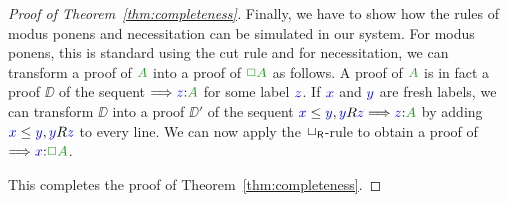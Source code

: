 \begin{proof}[Proof of Theorem~\ref{thm:completeness}]
  
  
  Finally, we have to show how the rules of modus ponens and
  necessitation can be simulated in our system. For modus ponens, this
  is standard using the cut rule and for necessitation, we can
  transform a proof of $\fm A$ into a proof of $\fm{\BOX A}$ as
  follows.
  A proof of $\fm A$ is in fact a proof $\DD$ of the sequent
  $\SEQ{\labels{z}{A}}$ for some label ${\color{blue}{z}}$. If ${\color{blue}{x}}$ and ${\color{blue}{y}}$
  are fresh labels, we can transform $\DD$ into a proof $\DD'$ of the
  sequent $\futs xy, \accs yz \SEQ \labels{z}{A}$ by adding ${\color{blue}{x}}\le{{\color{blue}{y}}},
  {\color{blue}{y}}R{\color{blue}{z}}$ to every line. We can now apply the $\mathsf{\mathord{\Box}}_{\mathsf{R}}$-rule to
  obtain a proof of $\SEQ \labels{x}{\BOX A}$.
  
%
%	
%	
%	
	
%	
%	
%	
%	
%	

  
  This completes the proof of Theorem~\ref{thm:completeness}.
\end{proof}

